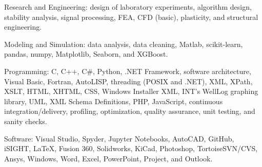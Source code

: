\documentclass{leresume}
\begin{document}
    \begin{bulletedlist}
		
		\item Research and Engineering: design of laboratory experiments,
                        algorithm design,
                        stability analysis,
                        signal processing,
                        FEA,
                        CFD (basic),
                        plasticity,
                        and structural engineering.
                        
		\item Modeling and Simulation: data analysis,
                        data cleaning,
                        Matlab,
                        scikit-learn,
                        pandas,
                        numpy,
                        Matplotlib,
                        Seaborn,
                        and XGBoost.
                        
		\item Programming: C,
                        C++,
                        C\#,
                        Python,
                        .NET Framework,
                        software architecture,
                        Visual Basic,
                        Fortran,
                        AutoLISP,
                        threading (POSIX and .NET),
                        XML,
                        XPath,
                        XSLT,
                        HTML,
                        XHTML,
                        CSS,
                        Windows Installer XML,
                        INT's WellLog graphing library,
                        UML,
                        XML Schema Definitions,
                        PHP,
                        JavaScript,
                        continuous integration/delivery,
                        profiling,
                        optimization,
                        quality assurance,
                        unit testing,
                        and sanity checks.
                        
		\item Software: Visual Studio,
                        Spyder,
                        Jupyter Notebooks,
                        AutoCAD,
                        GitHub,
                        iSIGHT,
                        LaTeX,
                        Fusion 360,
                        Solidworks,
                        KiCad,
                        Photoshop,
                        TortoiseSVN/CVS,
                        Ansys,
                        Windows,
                        Word,
                        Excel,
                        PowerPoint,
                        Project,
                        and Outlook.
                        

\end{bulletedlist}
\end{document}

